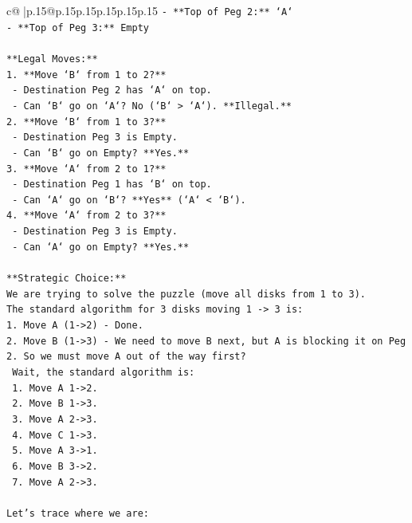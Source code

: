 \documentclass{article}
\begin{document}
{\begin{supertabular}{c@{$\;$}|p{.15\linewidth}@{}p{.15\linewidth}p{.15\linewidth}p{.15\linewidth}p{.15\linewidth}p{.15\linewidth}}
{{{\texttt{{-} **Top of Peg 2:** `A`} \\
\texttt{{-} **Top of Peg 3:** Empty} \\
\\ 
\texttt{**Legal Moves:**} \\
\texttt{1.  **Move `B` from 1 to 2?**} \\
\texttt{    {-} Destination Peg 2 has `A` on top.} \\
\texttt{    {-} Can `B` go on `A`? No (`B` > `A`). **Illegal.**} \\
\texttt{2.  **Move `B` from 1 to 3?**} \\
\texttt{    {-} Destination Peg 3 is Empty.} \\
\texttt{    {-} Can `B` go on Empty? **Yes.**} \\
\texttt{3.  **Move `A` from 2 to 1?**} \\
\texttt{    {-} Destination Peg 1 has `B` on top.} \\
\texttt{    {-} Can `A` go on `B`? **Yes** (`A` < `B`).} \\
\texttt{4.  **Move `A` from 2 to 3?**} \\
\texttt{    {-} Destination Peg 3 is Empty.} \\
\texttt{    {-} Can `A` go on Empty? **Yes.**} \\
\\ 
\texttt{**Strategic Choice:**} \\
\texttt{We are trying to solve the puzzle (move all disks from 1 to 3).} \\
\texttt{The standard algorithm for 3 disks moving 1 {-}> 3 is:} \\
\texttt{1. Move A (1{-}>2) {-} Done.} \\
\texttt{2. Move B (1{-}>3) {-} We need to move B next, but A is blocking it on Peg 2. So we must move A out of the way first?} \\
\texttt{   Wait, the standard algorithm is:} \\
\texttt{   1. Move A 1{-}>2.} \\
\texttt{   2. Move B 1{-}>3.} \\
\texttt{   3. Move A 2{-}>3.} \\
\texttt{   4. Move C 1{-}>3.} \\
\texttt{   5. Move A 3{-}>1.} \\
\texttt{   6. Move B 3{-}>2.} \\
\texttt{   7. Move A 2{-}>3.} \\
\\ 
\texttt{Let's trace where we are:} \\
}}}
\end{supertabular}}
\end{document}
